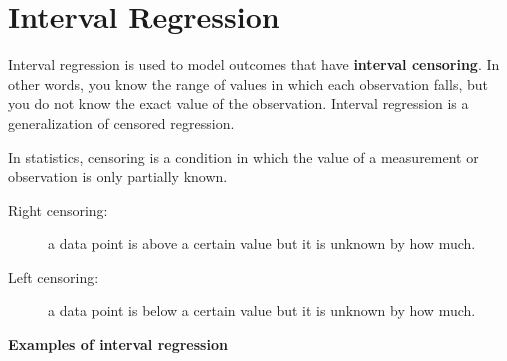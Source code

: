 \documentclass[a4paper,12pt]{article}
\begin{document}
	\Large

\section{Interval Regression}

Interval regression is used to model outcomes that have \textbf{interval censoring}.  In other words, you know the range of values in which each observation falls, but you do not know the exact value of the observation.  Interval regression is a generalization of censored regression.

\begin{framed}
\noindent	In statistics,  censoring is a condition in which the value of a measurement or observation is only partially known.
\begin{description}
	\item[Right censoring:] a data point is above a certain value but it is unknown by how much.
	\item[Left censoring:] a data point is below a certain value but it is unknown by how much.
\end{description}
\end{framed}
\noindent \textbf{Examples of interval regression}
\end{document}
